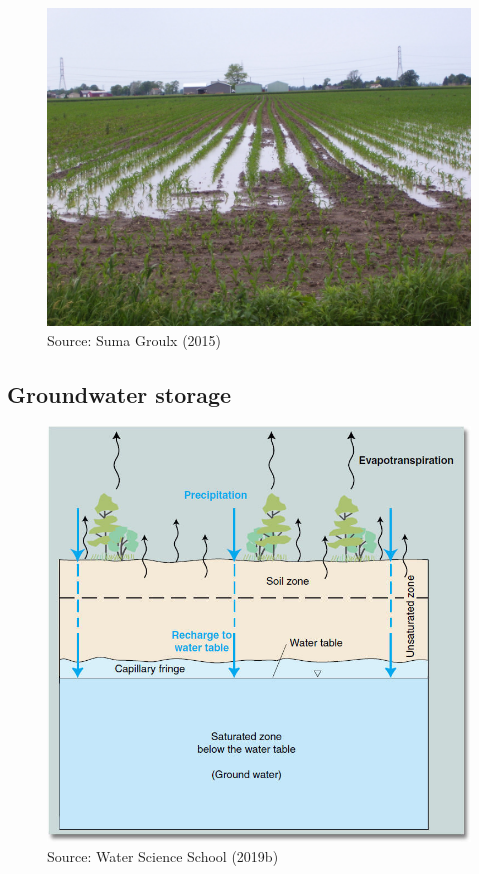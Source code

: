 \documentclass[
  letterpaper,
  DIV=11,
  numbers=noendperiod]{scrreprt}
\begin{document}
\begin{figure}

{\centering \includegraphics{archive/figures/infiltration.jpg}

}

\caption{Source: Suma Groulx (2015)}

\end{figure}

\hypertarget{groundwater-storage}{%
\subsection{Groundwater storage}\label{groundwater-storage}}

\begin{figure}

{\centering \includegraphics{archive/figures/groundwater.jpg}

}

\caption{Source: Water Science School (2019b)}

\end{figure}
\end{document}
